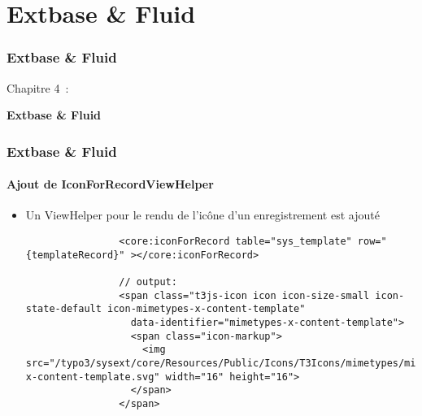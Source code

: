 %

\section{Extbase \& Fluid}
\begin{frame}[fragile]
	\frametitle{Extbase \& Fluid}

	\begin{center}\huge{Chapitre 4~:}\end{center}
	\begin{center}\huge{\color{typo3darkgrey}\textbf{Extbase \& Fluid}}\end{center}

\end{frame}

\begin{frame}[fragile]
	\frametitle{Extbase \& Fluid}
	\framesubtitle{Ajout de IconForRecordViewHelper}

	\lstset{basicstyle=\tiny\ttfamily}

	\begin{itemize}

		\item Un ViewHelper pour le rendu de l'icône d'un enregistrement est ajouté

			\begin{lstlisting}
				<core:iconForRecord table="sys_template" row="{templateRecord}" ></core:iconForRecord>

				// output:
				<span class="t3js-icon icon icon-size-small icon-state-default icon-mimetypes-x-content-template"
				  data-identifier="mimetypes-x-content-template">
				  <span class="icon-markup">
				    <img src="/typo3/sysext/core/Resources/Public/Icons/T3Icons/mimetypes/mimetypes-x-content-template.svg" width="16" height="16">
				  </span>
				</span>
			\end{lstlisting}

	\end{itemize}

\end{frame}

